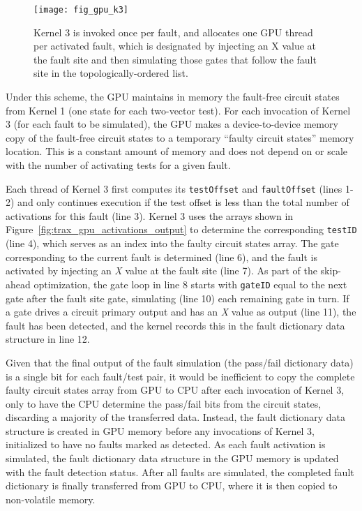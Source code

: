 \begin{figure}[hbtp]
\centering
\texttt{[image: fig\_gpu\_k3]}
\caption{Kernel 3 is invoked once per fault, and allocates one GPU thread per activated fault, which is designated by injecting an X value at the fault site and then simulating those gates that follow the fault site in the topologically-ordered list.}
\label{fig:trax_gpu_k3}
\end{figure}

Under this scheme, the GPU maintains in memory the fault-free circuit states from Kernel 1 (one state for each two-vector test).
%
For each invocation of Kernel 3 (for each fault to be simulated), the GPU makes a device-to-device memory copy of the fault-free circuit states to a temporary ``faulty circuit states'' memory location.
%
This is a constant amount of memory and does not depend on or scale with the number of activating tests for a given fault.

Each thread of Kernel 3 first computes its \verb+testOffset+ and \verb+faultOffset+ (lines 1-2) and only continues execution if the test offset is less than the total number of activations for this fault (line 3).
%
Kernel 3 uses the arrays shown in Figure~\ref{fig:trax_gpu_activations_output} to determine the corresponding \verb+testID+ (line 4), which serves as an index into the faulty circuit states array.
%
The gate corresponding to the current fault is determined (line 6), and the fault is activated by injecting an \textit{X} value at the fault site (line 7).
%
As part of the skip-ahead optimization, the gate loop in line 8 starts with \verb+gateID+ equal to the next gate after the fault site gate, simulating (line 10) each remaining gate in turn.
%
If a gate drives a circuit primary output and has an \textit{X} value as output (line 11), the fault has been detected, and the kernel records this in the fault dictionary data structure in line 12.

Given that the final output of the fault simulation (the pass/fail dictionary data) is a single bit for each fault/test pair, it would be inefficient to copy the complete faulty circuit states array from GPU to CPU after each invocation of Kernel 3, only to have the CPU determine the pass/fail bits from the circuit states, discarding a majority of the transferred data.
%
Instead, the fault dictionary data structure is created in GPU memory before any invocations of Kernel 3, initialized to have no faults marked as detected.
%
As each fault activation is simulated, the fault dictionary data structure in the GPU memory is updated with the fault detection status.
%
After all faults are simulated, the completed fault dictionary is finally transferred from GPU to CPU, where it is then copied to non-volatile memory.

